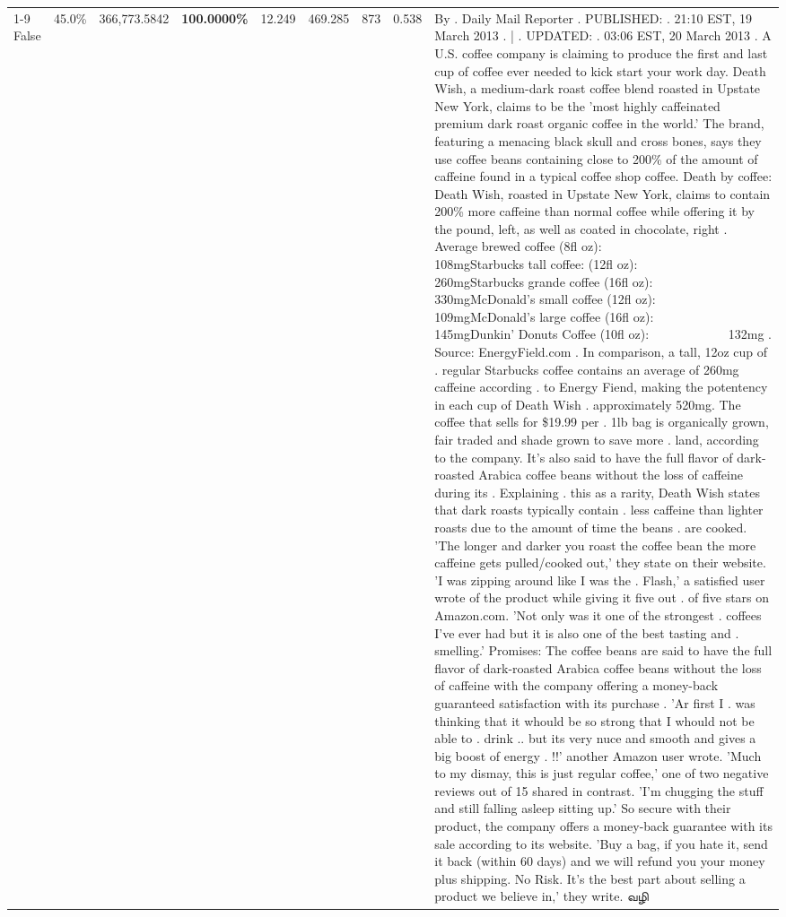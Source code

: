 \begin{table}[H]
{\begin{tabular}{lllrlllll}
\cline{1-9}
False & 45.0\% & 366,773.5842 & \bfseries \color{red} 100.0000\% & 12.249 & 469.285 & 873 & 0.538 & By . Daily Mail Reporter . PUBLISHED: . 21:10 EST, 19 March 2013 . | . UPDATED: . 03:06 EST, 20 March 2013 . A U.S. coffee company is claiming to produce the first and last cup of coffee ever needed to kick start your work day. Death Wish, a medium-dark roast coffee blend roasted in Upstate New York, claims to be the 'most highly caffeinated premium dark roast organic coffee in the world.' The brand, featuring a menacing black skull and cross bones, says they use coffee beans containing close to 200\% of the amount of caffeine found in a typical coffee shop coffee. Death by coffee: Death Wish, roasted in Upstate New York, claims to contain 200\% more caffeine than normal coffee while offering it by the pound, left, as well as coated in chocolate, right . Average brewed coffee (8fl oz):              108mgStarbucks tall coffee: (12fl oz):                260mgStarbucks grande coffee (16fl oz):         330mgMcDonald's small coffee (12fl oz):           109mgMcDonald's large coffee (16fl oz):           145mgDunkin' Donuts Coffee (10fl oz):             132mg . Source: EnergyField.com . In comparison, a tall, 12oz cup of . regular Starbucks coffee contains an average of 260mg caffeine according . to Energy Fiend, making the potentency in each cup of Death Wish . approximately 520mg. The coffee that sells for \$19.99 per . 1lb bag is organically grown, fair traded and shade grown to save more . land, according to the company. It's also said to have the full flavor of dark-roasted Arabica coffee beans without the loss of caffeine during its . Explaining . this as a rarity, Death Wish states that dark roasts typically contain . less caffeine than lighter roasts due to the amount of time the beans . are cooked. 'The longer and darker you roast the coffee bean the more caffeine gets pulled/cooked out,' they state on their website. 'I was zipping around like I was the . Flash,' a satisfied user wrote of the product while giving it five out . of five stars on Amazon.com. 'Not only was it one of the strongest . coffees I've ever had but it is also one of the best tasting and . smelling.’ Promises: The coffee beans are said to have the full flavor of dark-roasted Arabica coffee beans without the loss of caffeine with the company offering a money-back guaranteed satisfaction with its purchase . 'Ar first I . was thinking that it whould be so strong that I whould not be able to . drink .. but its very nuce and smooth and gives a big boost of energy . !!' another Amazon user wrote. 'Much to my dismay, this is just regular coffee,' one of two negative reviews out of 15 shared in contrast. 'I'm chugging the stuff and still falling asleep sitting up.' So secure with their product, the company offers a money-back guarantee with its sale according to its website. 'Buy a bag, if you hate it, send it back (within 60 days) and we will refund you your money plus shipping. No Risk. It’s the best part about selling a product we believe in,' they write. வழி \\

\end{tabular}}
\end{table}
